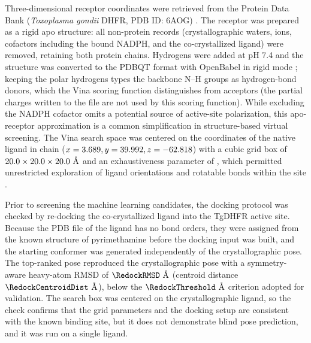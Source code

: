 \documentclass[a4paper,11pt]{article}
\begin{document}
Three-dimensional receptor coordinates were retrieved from the Protein Data Bank (\textit{Toxoplasma gondii} DHFR, PDB ID: 6AOG) \citep{consortium2019, berman2003}. The receptor was prepared as a rigid apo structure: all non-protein records (crystallographic waters, ions, cofactors including the bound NADPH, and the co-crystallized ligand) were removed, retaining both protein chains. Hydrogens were added at pH 7.4 and the structure was converted to the PDBQT format with OpenBabel in rigid mode \citep{babel2011}; keeping the polar hydrogens types the backbone N--H groups as hydrogen-bond donors, which the Vina scoring function distinguishes from acceptors (the partial charges written to the file are not used by this scoring function). While excluding the NADPH cofactor omits a potential source of active-site polarization, this apo-receptor approximation is a common simplification in structure-based virtual screening. The Vina search space was centered on the coordinates of the native \RedockLigand{} ligand in chain \RedockChain{} ($x = 3.689{}, y = 39.992{}, z = -62.818$) with a cubic grid box of $20.0{} \times 20.0{} \times 20.0{}\text{ \AA}$ and an exhaustiveness parameter of \DockExhaustiveness{}, which permitted unrestricted exploration of ligand orientations and rotatable bonds within the site \citep{trott2009}.

Prior to screening the machine learning candidates, the docking protocol was checked by re-docking the co-crystallized \RedockLigand{} ligand into the TgDHFR active site. Because the PDB file of the ligand has no bond orders, they were assigned from the known structure of pyrimethamine before the docking input was built, and the starting conformer was generated independently of the crystallographic pose. The top-ranked pose reproduced the crystallographic pose with a symmetry-aware heavy-atom RMSD of $\RedockRMSD\text{ \AA}$ (centroid distance $\RedockCentroidDist\text{ \AA}$), below the $\RedockThreshold\text{ \AA}$ criterion adopted for validation. The search box was centered on the crystallographic ligand, so the check confirms that the grid parameters and the docking setup are consistent with the known binding site, but it does not demonstrate blind pose prediction, and it was run on a single ligand.
\end{document}

